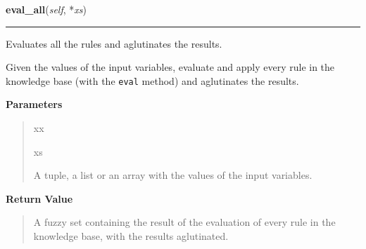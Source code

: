     \label{peach:fuzzy:control:Controller:eval_all}

    \vspace{0.5ex}

    \begin{boxedminipage}{\textwidth}

    \raggedright \textbf{eval\_all}(\textit{self}, *\textit{xs})

    \vspace{-1.5ex}

    \rule{\textwidth}{0.5\fboxrule}

Evaluates all the rules and aglutinates the results.

Given the values of the input variables, evaluate and apply every rule
in the knowledge base (with the \texttt{eval} method) and aglutinates the
results.
    \vspace{1ex}

      \textbf{Parameters}
      \begin{quote}
        \begin{Ventry}{xx}

          \item[xs]


A tuple, a list or an array with the values of the input variables.
        \end{Ventry}

      \end{quote}

    \vspace{1ex}

      \textbf{Return Value}
      \begin{quote}

A fuzzy set containing the result of the evaluation of every rule in
the knowledge base, with the results aglutinated.
      \end{quote}

    \vspace{1ex}

    \end{boxedminipage}

    \label{peach:fuzzy:control:Controller:set_aglutination}

